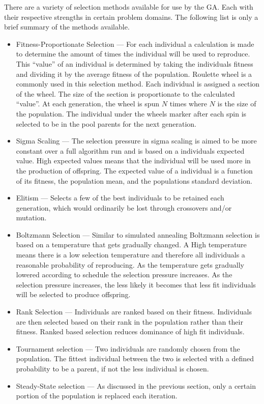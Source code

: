 There are a variety of selection methods available for use by the \gls{GA}. Each with their respective strengths in certain problem domains. The following list is only a brief summary of the methods available.
\begin{itemize}
    \item{Fitness-Proportionate Selection} --- For each individual a calculation is made to determine the amount of times the individual will be used to reproduce. This ``value'' of an individual is determined by taking the individuals fitness and dividing it by the average fitness of the population. Roulette wheel is a commonly used in this selection method. Each individual is assigned a section of the wheel. The size of the section is proportionate to the calculated ``value''. At each generation, the wheel is spun $N$ times where $N$ is the size of the population. The individual under the wheels marker after each spin is selected to be in the pool parents for the next generation\cite{IntroToGAs}.
    \item{Sigma Scaling} --- The selection pressure in sigma scaling is aimed to be more constant over a full algorithm run and is based on a individuals expected value. High expected values means that the individual will be used more in the production of offspring. The expected value of a individual is a function of its fitness, the population mean, and the populations standard deviation\cite{IntroToGAs}.
    \item{Elitism} --- Selects a few of the best individuals to be retained each generation, which would ordinarily be lost through crossovers and/or mutation.
    \item{Boltzmann Selection} --- Similar to simulated annealing Boltzmann selection is based on a temperature that gets gradually changed. A High temperature means there is a low selection temperature and therefore all individuals a reasonable probability of reproducing. As the temperature gets gradually lowered according to schedule the selection pressure increases. As the selection pressure increases, the less likely it becomes that less fit individuals will be selected to produce offspring\cite{IntroToGAs}.
    \item{Rank Selection} --- Individuals are ranked based on their fitness. Individuals are then selected based on their rank in the population rather than their fitness.  Ranked based selection reduces dominance of high fit individuals\cite{IntroToGAs}.
    \item{Tournament selection} --- Two individuals are randomly chosen from the population. The fittest individual between the two is selected with a defined probability to be a parent, if not the less individual is chosen\cite{IntroToGAs}.
    \item{Steady-State selection} --- As discussed in the previous section, only a certain portion of the population is replaced each iteration.
\end{itemize}


